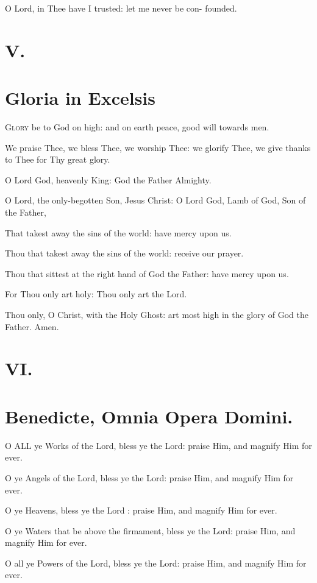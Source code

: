 O Lord, in Thee have I trusted: let me never be con-
founded. 

\section*{V.}
\section*{Gloria in Excelsis}

\lettrine{G}{lory} be to God on high: and on earth peace, good will towards men.

We praise Thee, we bless Thee, we worship Thee: we glorify Thee, we give thanks to Thee for Thy great glory.

O Lord God, heavenly King: God the Father Almighty.

O Lord, the only-begotten Son, Jesus Christ: O Lord God, Lamb of God, Son of the Father,

That takest away the sins of the world: have mercy upon us.

Thou that takest away the sins of the world: receive our prayer.

Thou that sittest at the right hand of God the Father: have mercy upon us.

For Thou only art holy: Thou only art the Lord.

Thou only, O Christ, with the Holy Ghost: art most high in the glory of God the Father. Amen. 

\section*{VI.}
\section*{Benedicte, Omnia Opera Domini.}

\lettrine{O}{ ALL} ye Works of the Lord, bless ye the Lord: praise Him, and magnify Him for ever.

O ye Angels of the Lord, bless ye the Lord: praise Him, and magnify Him for ever.

O ye Heavens, bless ye the Lord : praise Him, and magnify Him for ever.

O ye Waters that be above the firmament, bless ye the Lord: praise Him, and magnify Him for ever.

O all ye Powers of the Lord, bless ye the Lord: praise Him, and magnify Him for ever.

